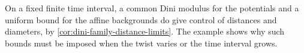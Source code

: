 On a fixed finite time interval, a common Dini modulus for the potentials and a uniform bound for the affine backgrounds do give control of distances and diameters, by \cref{cor:dini-family-distance-limits}. The example shows why such bounds must be imposed when the twist varies or the time interval grows.
